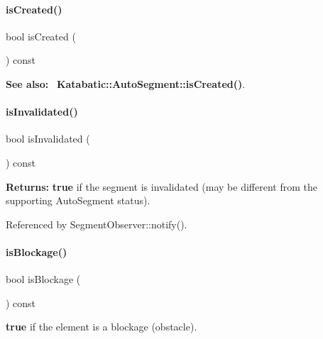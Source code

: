 \paragraph{\texorpdfstring{is\+Created()}{isCreated()}}
{\footnotesize\ttfamily bool is\+Created (\begin{DoxyParamCaption}{ }\end{DoxyParamCaption}) const\hspace{0.3cm}{\ttfamily [inline]}}

{\bfseries See also\+:}~ \textbf{ Katabatic\+::\+Auto\+Segment\+::is\+Created()}. \mbox{\label{classKite_1_1TrackElement_ac540608485240ff88970131ebc02c1ab}} 
\paragraph{\texorpdfstring{is\+Invalidated()}{isInvalidated()}}
{\footnotesize\ttfamily bool is\+Invalidated (\begin{DoxyParamCaption}{ }\end{DoxyParamCaption}) const\hspace{0.3cm}{\ttfamily [inline]}}

{\bfseries Returns\+:} {\bfseries true} if the segment is invalidated (may be different from the supporting Auto\+Segment status). 

Referenced by Segment\+Observer\+::notify().

\mbox{\label{classKite_1_1TrackElement_a3fffa77f98cf6f0375f831bddce8a8fe}} 
\paragraph{\texorpdfstring{is\+Blockage()}{isBlockage()}}
{\footnotesize\ttfamily bool is\+Blockage (\begin{DoxyParamCaption}{ }\end{DoxyParamCaption}) const\hspace{0.3cm}{\ttfamily [inline]}}

{\bfseries true} if the element is a blockage (obstacle). 

